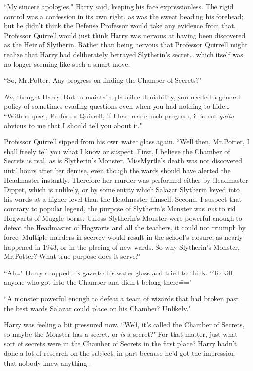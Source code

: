``My sincere apologies," Harry said, keeping his face expressionless. The rigid control was a confession in its own right, as was the sweat beading his forehead; but he didn't think the Defense Professor would take any evidence from that. Professor Quirrell would just think Harry was nervous at having been discovered as the Heir of Slytherin. Rather than being nervous that Professor Quirrell might realize that Harry had deliberately betrayed Slytherin's secret{\ldots} which itself was no longer seeming like such a smart move.

``So, Mr.\?Potter. Any progress on finding the Chamber of Secrets?"

\emph{No,} thought Harry. But to maintain plausible deniability, you needed a general policy of sometimes evading questions even when you had nothing to hide{\ldots} ``With respect, Professor Quirrell, if I had made such progress, it is not \emph{quite} obvious to me that I should tell you about it."

Professor Quirrell sipped from his own water glass again. ``Well then, Mr.\?Potter, I shall freely tell you what I know or suspect. First, I believe the Chamber of Secrets is real, as is Slytherin's Monster. Miss\?Myrtle's death was not discovered until hours after her demise, even though the wards should have alerted the Headmaster instantly. Therefore her murder was performed either by Headmaster Dippet, which is unlikely, or by some entity which Salazar Slytherin keyed into his wards at a higher level than the Headmaster himself. Second, I suspect that contrary to popular legend, the purpose of Slytherin's Monster was \emph{not} to rid Hogwarts of Muggle-borns. Unless Slytherin's Monster were powerful enough to defeat the Headmaster of Hogwarts and all the teachers, it could not triumph by force. Multiple murders in secrecy would result in the school's closure, as nearly happened in 1943, or in the placing of new wards. So why Slytherin's Monster, Mr.\?Potter? What true purpose does it serve?"

``Ah{\ldots}" Harry dropped his gaze to his water glass and tried to think. ``To kill anyone who got into the Chamber and didn't belong there\==="

``A monster powerful enough to defeat a team of wizards that had broken past the best wards Salazar could place on his Chamber? Unlikely."

Harry was feeling a bit pressured now. ``Well, it's called the Chamber of Secrets, so maybe the Monster has a secret, or \emph{is} a secret?" For that matter, just what sort of secrets were in the Chamber of Secrets in the first place? Harry hadn't done a lot of research on the subject, in part because he'd got the impression that nobody knew anything\---

